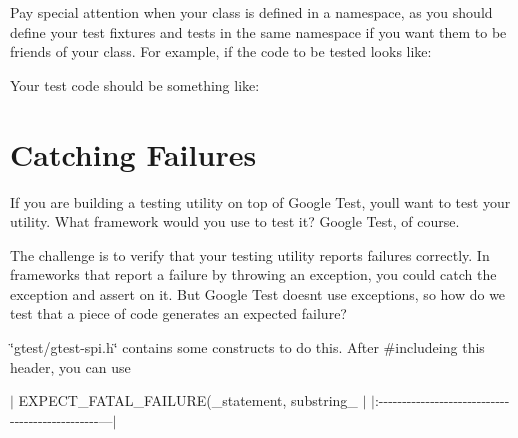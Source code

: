 Pay special attention when your class is defined in a namespace, as you should define your test fixtures and tests in the same namespace if you want them to be friends of your class. For example, if the code to be tested looks like\+:


\begin{DoxyCode}{0}
\DoxyCodeLine{}
\DoxyCodeLine{\};}
\DoxyCodeLine{}
\end{DoxyCode}


Your test code should be something like\+:


\begin{DoxyCode}{0}
\DoxyCodeLine{\};}
\DoxyCodeLine{}
\DoxyCodeLine{}
\end{DoxyCode}


\section*{Catching Failures}

If you are building a testing utility on top of Google Test, you\textquotesingle{}ll want to test your utility. What framework would you use to test it? Google Test, of course.

The challenge is to verify that your testing utility reports failures correctly. In frameworks that report a failure by throwing an exception, you could catch the exception and assert on it. But Google Test doesn\textquotesingle{}t use exceptions, so how do we test that a piece of code generates an expected failure?

{\ttfamily \char`\"{}gtest/gtest-\/spi.\+h\char`\"{}} contains some constructs to do this. After {\ttfamily \#include}ing this header, you can use

$\vert$ {\ttfamily E\+X\+P\+E\+C\+T\+\_\+\+F\+A\+T\+A\+L\+\_\+\+F\+A\+I\+L\+U\+RE(}\+\_\+statement, substring\+\_\+{\ttfamily );} $\vert$ $\vert$\+:-\/-\/-\/-\/-\/-\/-\/-\/-\/-\/-\/-\/-\/-\/-\/-\/-\/-\/-\/-\/-\/-\/-\/-\/-\/-\/-\/-\/-\/-\/-\/-\/-\/-\/-\/-\/-\/-\/-\/-\/-\/-\/-\/-\/-\/-\/-\/---$\vert$

